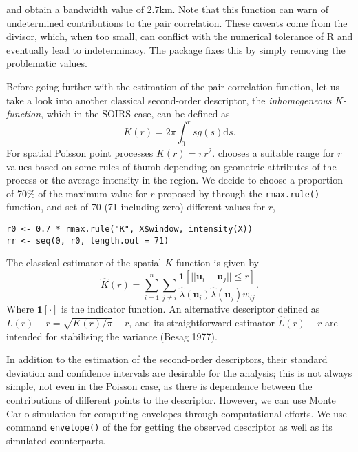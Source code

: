 and obtain a bandwidth value of \(2.7\)km. Note that this function can warn of undetermined contributions to the pair correlation. These caveats come from the divisor, which, when too small, can conflict with the numerical tolerance of R and eventually lead to indeterminacy. The  package fixes this by simply removing the problematic values.

Before going further with the estimation of the pair correlation function, let us take a look into another classical second-order descriptor, the \emph{inhomogeneous \(K\)-function}, which in the SOIRS case, can be defined as
\[
    K(r)=2\pi \int_0^r sg(s)\text{d} s.
\]
For spatial Poisson point processes \(K(r)=\pi r^2\).  chooses a suitable range for \(r\) values based on some rules of thumb depending on geometric attributes of the process or the average intensity in the region. We decide to choose a proportion of 70\% of the maximum value for \(r\) proposed by  through the \texttt{rmax.rule()} function, and set of 70 (71 including zero) different values for \(r\),

\begin{verbatim}
r0 <- 0.7 * rmax.rule("K", X$window, intensity(X))
rr <- seq(0, r0, length.out = 71)
\end{verbatim}

The classical estimator of the spatial \(K\)-function is given by
\begin{equation*}
    \hat{K}(r)= \sum_{i=1}^n \sum_{j \neq i}
    \frac{\mathbf{1}\left[|| \mathbf{u}_{i}-\mathbf{u}_{j} || \leq r\right]}{\hat{\lambda}(\mathbf{u}_{i}) \hat{\lambda} (\mathbf{u}_{j}) w_{ij}}.
    \label{eq:Kstimatormoller}
\end{equation*}
Where \(\mathbf{1}[\cdot]\) is the indicator function. An alternative descriptor defined as \(L(r)-r= \sqrt{K(r) / \pi}-r\), and its straightforward estimator \(\hat{L}(r)-r\) are intended for stabilising the variance (Besag 1977).

In addition to the estimation of the second-order descriptors, their standard deviation and confidence intervals are desirable for the analysis; this is not always simple, not even in the Poisson case, as there is dependence between the contributions of different points to the descriptor. However, we can use Monte Carlo simulation for computing envelopes through computational efforts. We use command \texttt{envelope()} of the  for getting the observed descriptor as well as its simulated counterparts.

